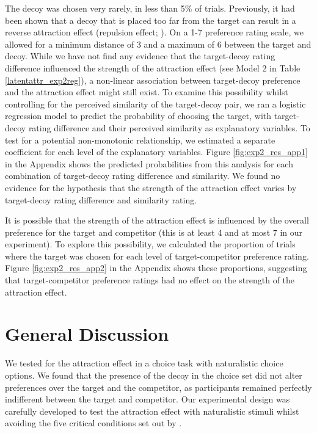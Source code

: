 \documentclass[12pt, a4paper]{article}
\begin{document}
The decoy was chosen very rarely, in less than 5\% of trials. Previously, it had been shown that a decoy that is placed too far from the target can result in a reverse attraction effect (repulsion effect; ). On a 1-7 preference rating scale, we allowed for a minimum distance of 3 and a maximum of 6 between the target and decoy. While we have not find any evidence that the target-decoy rating difference influenced the strength of the attraction effect (see Model 2 in Table \ref{latentattr_exp2reg}), a non-linear association between target-decoy preference and the attraction effect might still exist. To examine this possibility whilst controlling for the perceived similarity of the target-decoy pair, we ran a logistic regression model to predict the probability of choosing the target, with target-decoy rating difference and their perceived similarity as explanatory variables. To test for a potential non-monotonic relationship, we estimated a separate coefficient for each level of the explanatory variables. Figure \ref{fig:exp2_res_app1}  in the Appendix shows the predicted probabilities from this analysis for each combination of target-decoy rating difference and similarity. We found no evidence for the hypothesis that the strength of the attraction effect varies by target-decoy rating difference and similarity rating.

It is possible that the strength of the attraction effect is influenced by the overall preference for the target and competitor (this is at least 4 and at most 7 in our experiment). To explore this possibility, we calculated the proportion of trials where the target was chosen for each level of target-competitor preference rating. Figure \ref{fig:exp2_res_app2} in the Appendix shows these proportions, suggesting that target-competitor preference ratings had no effect on the strength of the attraction effect. 


\section*{General Discussion}

We tested for the attraction effect in a choice task with naturalistic choice options. We found that the presence of the decoy in the choice set did not alter preferences over the target and the competitor, as participants remained perfectly indifferent between the target and competitor. Our experimental design was carefully developed to test the attraction effect with naturalistic stimuli whilst avoiding the five critical conditions set out by .
\end{document}

